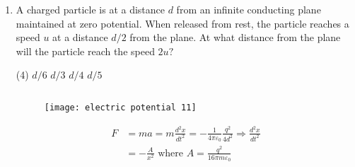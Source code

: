 \begin{enumerate}
	\begin{tasks}(2)
		\task[\textbf{A.}]  $-\frac{10 e}{9 \pi \varepsilon_{0} d^{2}}(1,0,0)$
		\task[\textbf{B.}]  $\frac{10 e}{9 \pi \varepsilon_{0} d^{2}}(1,0,0)$
		\task[\textbf{C.}] $\frac{e}{\pi \varepsilon_{0} d^{2}}(1,0,0)$
		\task[\textbf{D.}] $-\frac{e}{\pi \varepsilon_{0} d^{2}}(1,0,0)$
	\end{tasks}
	\begin{answer}$\left. \right. $
		\begin{figure}[H]
			\centering
			\texttt{[image: electric potential 10]}
		\end{figure}
		\begin{align*}
		E_{+}&=\frac{1}{4 \pi \varepsilon_{0}} \frac{e}{(3 d / 2)^{2}}=\frac{1}{4 \pi \varepsilon_{0}} \frac{4 e}{9 d^{2}}\text{ and }E_{-}\\&=\frac{1}{4 \pi \varepsilon_{0}} \frac{e}{(d / 2)^{2}}=\frac{1}{4 \pi \varepsilon_{0}} \frac{4 e}{d^{2}}
		\intertext{Thus resultant electric field at point $P$ is}
		E&=E_{+}+E_{-}=\frac{1}{4 \pi \varepsilon_{0}} \frac{4 e}{9 d^{2}}+\frac{1}{4 \pi \varepsilon_{0}} \frac{4 e}{d^{2}}\\&=\frac{1}{4 \pi \varepsilon_{0}} \frac{40 e}{9 d^{2}}=\frac{1}{9 \pi \varepsilon_{0}} \frac{10 e}{d^{2}} \Rightarrow \vec{E}=\frac{1}{9 \pi \varepsilon_{0}} \frac{10 e}{d^{2}} \hat{x}
		\end{align*}
		So the correct answer is \textbf{Option (B)}
	\end{answer}
	\item A charged particle is at a distance $d$ from an infinite conducting plane maintained at zero potential. When released from rest, the particle reaches a speed $u$ at a distance $d / 2$ from the plane. At what distance from the plane will the particle reach the speed $2 u ?$
	{}
	\begin{tasks}(4)
		\task[\textbf{A.}] $d / 6$
		\task[\textbf{B.}] $d / 3$
		\task[\textbf{C.}] $d / 4$
		\task[\textbf{D.}] $d / 5$
	\end{tasks}
	\begin{answer}$\left. \right. $
		\begin{figure}[H]
			\centering
			\texttt{[image: electric potential 11]}
		\end{figure}
		\begin{align*}
		F&=m a=m \frac{d^{2} x}{d t^{2}}=-\frac{1}{4 \pi \varepsilon_{0}} \frac{q^{2}}{4 d^{2}} \Rightarrow \frac{d^{2} x}{d t^{2}}\\&=-\frac{A}{x^{2}}\text{ where }A=\frac{q^{2}}{16 \pi m \varepsilon_{0}}\\

\end{align*}
\end{answer}
\end{enumerate}
